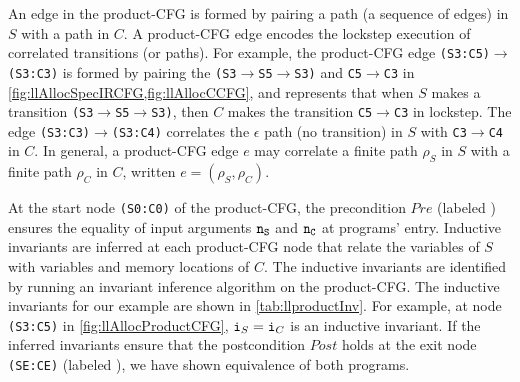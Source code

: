 An edge in the product-CFG is formed by pairing a path (a sequence of edges) in $S$ with a path in $C$.
A product-CFG edge encodes the lockstep execution of correlated
transitions (or paths).
For example, the product-CFG edge {\tt (S3:C5)}$\rightarrow${\tt (S3:C3)} is formed by pairing the
{\small \tt (S3$\rightarrow$S5$\rightarrow$S3)} and {\small \tt C5$\rightarrow$C3}
in \cref{fig:llAllocSpecIRCFG,fig:llAllocCCFG},
and represents that when $S$ makes a transition {\small \tt (S3$\rightarrow$S5$\rightarrow$S3)},
then $C$ makes the transition {\small \tt C5$\rightarrow$C3}
in lockstep.
The edge {\small \tt (S3:C3)$\rightarrow$(S3:C4)}
correlates the $\epsilon$ path (no transition) in $S$ with {\small \tt C3$\rightarrow$C4} in $C$.
In general, a product-CFG edge $e$ may correlate a finite path $\rho_S$
in $S$ with a finite path $\rho_C$ in $C$,
written $e=(\rho_S,\rho_C)$.



At the start node {\tt (S0:C0)} of the product-CFG, the precondition $Pre$
(labeled )
ensures the equality
of input arguments ${\tt n_{S}}$ and ${\tt n_{C}}$ at programs' entry.
Inductive invariants are inferred at each
product-CFG node that
relate the variables of $S$ with variables
and memory locations of $C$.
The inductive invariants
are identified by running an invariant inference
algorithm on the product-CFG. The inductive invariants
for our example are shown in \cref{tab:llproductInv}.
For example, at node {\tt (S3:C5)} in \cref{fig:llAllocProductCFG},
${\tt i}_S={\tt i}_C$ is an inductive
invariant. If the inferred invariants ensure
that the postcondition $Post$ holds at the
exit node {\tt (SE:CE)} (labeled ), we have shown
equivalence of both programs.

